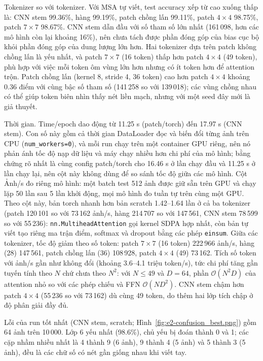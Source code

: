 Tokenizer so với tokenizer. Với MSA tự viết, test accuracy xếp từ cao xuống thấp là: CNN stem 99.36\%, hàng 99.19\%, patch chồng lấn 99.11\%, patch \(4\times4\) 98.75\%, patch \(7\times7\) 98.67\%. CNN stem dẫn đầu với số tham số lớn nhất (161\,098, hơn các mô hình còn lại khoảng 16\%), nên chưa tách được phần đóng góp của bias cục bộ khỏi phần đóng góp của dung lượng lớn hơn. Hai tokenizer dựa trên patch không chồng lấn là yếu nhất, và patch \(7\times7\) (16 token) thấp hơn patch \(4\times4\) (49 token), phù hợp với việc mỗi token ôm vùng lớn hơn nhưng có ít token hơn để attention trộn. Patch chồng lấn (kernel 8, stride 4, 36 token) cao hơn patch \(4\times4\) khoảng 0.36 điểm với cùng bậc số tham số (141\,258 so với 139\,018); các vùng chồng nhau có thể giúp token biên nhìn thấy nét liền mạch, nhưng với một seed đây mới là giả thuyết.

Thời gian. Time/epoch dao động từ 11.25 s (patch/torch) đến 17.97 s (CNN stem). Con số này gồm cả thời gian DataLoader đọc và biến đổi từng ảnh trên CPU (\texttt{num\_workers=0}), và mỗi run chạy trên một container GPU riêng, nên nó phản ánh tốc độ nạp dữ liệu và máy chạy nhiều hơn chi phí của mô hình; bằng chứng rõ nhất là cùng config patch/torch cho 16.46 s ở lần chạy đầu và 11.25 s ở lần chạy lại, nên cột này không dùng để so sánh tốc độ giữa các mô hình. Cột Ảnh/s đo riêng mô hình: một batch test 512 ảnh được giữ sẵn trên GPU và chạy lặp 50 lần sau 5 lần khởi động, mọi mô hình đo tuần tự trên cùng một GPU.
Theo cột này, bản torch nhanh hơn bản scratch 1.42--1.64 lần ở cả ba tokenizer (patch 120\,101 so với 73\,162 ảnh/s, hàng 214\,707 so với 147\,561, CNN stem 78\,599 so với 55\,236): \texttt{nn.MultiheadAttention} gọi kernel SDPA hợp nhất, còn bản tự viết tạo riêng ma trận điểm, softmax và dropout bằng các phép \texttt{einsum}. Giữa các tokenizer, tốc độ giảm theo số token: patch \(7\times7\) (16 token) 222\,966 ảnh/s, hàng (28) 147\,561, patch chồng lấn (36) 108\,928, patch \(4\times4\) (49) 73\,162. Tích số token với ảnh/s gần như không đổi (khoảng 3.6--4.1 triệu token/s), tức chi phí tăng gần tuyến tính theo \(N\) chứ chưa theo \(N^2\): với \(N\le 49\) và \(D=64\), phần \(\mathcal{O}(N^2D)\) của attention nhỏ so với các phép chiếu và FFN \(\mathcal{O}(ND^2)\). CNN stem chậm hơn patch \(4\times4\) (55\,236 so với 73\,162) dù cùng 49 token, do thêm hai lớp tích chập ở độ phân giải đầy đủ.

Lỗi của run tốt nhất (CNN stem, scratch; Hình~\ref{fig:e2-confusion_best.png}) gồm 64 ảnh trên 10\,000. Lớp 6 yếu nhất (98.6\%), chủ yếu bị đoán thành 0 và 1; các cặp nhầm nhiều nhất là 4 thành 9 (6 ảnh), 9 thành 4 (5 ảnh) và 5 thành 3 (5 ảnh), đều là các chữ số có nét gần giống nhau khi viết tay.

